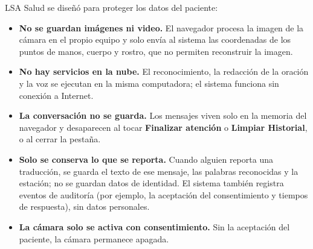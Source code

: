 LSA Salud se diseñó para proteger los datos del paciente:
\begin{itemize}
  \item \textbf{No se guardan imágenes ni video.} El navegador procesa la imagen de la cámara en el propio equipo y solo envía al sistema las coordenadas de los puntos de manos, cuerpo y rostro, que no permiten reconstruir la imagen.
  \item \textbf{No hay servicios en la nube.} El reconocimiento, la redacción de la oración y la voz se ejecutan en la misma computadora; el sistema funciona sin conexión a Internet.
  \item \textbf{La conversación no se guarda.} Los mensajes viven solo en la memoria del navegador y desaparecen al tocar \textbf{Finalizar atención} o \textbf{Limpiar Historial}, o al cerrar la pestaña.
  \item \textbf{Solo se conserva lo que se reporta.} Cuando alguien reporta una traducción, se guarda el texto de ese mensaje, las palabras reconocidas y la estación; no se guardan datos de identidad. El sistema también registra eventos de auditoría (por ejemplo, la aceptación del consentimiento y tiempos de respuesta), sin datos personales.
  \item \textbf{La cámara solo se activa con consentimiento.} Sin la aceptación del paciente, la cámara permanece apagada.
\end{itemize}

